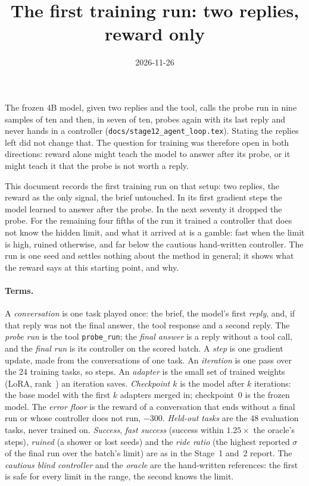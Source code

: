 \documentclass[11pt,a4paper]{article}
\title{\textbf{The first training run: two replies, reward only}}
\author{}
\date{2026-11-26}
\begin{document}
\maketitle

\noindent
The frozen 4B model, given two replies and the tool, calls the probe run in
nine samples of ten and then, in seven of ten, probes again with its last
reply and never hands in a controller (\texttt{docs/stage12\_agent\_loop.tex}).
Stating the replies left did not change that. The question for training was
therefore open in both directions: reward alone might teach the model to
answer after its probe, or it might teach it that the probe is not worth a
reply.

This document records the first training run on that setup: two replies,
the reward as the only signal, the brief untouched. In its first
\TRstepsperiteration{} gradient steps the model learned to answer after the
probe. In the next seventy it dropped the probe. For the remaining four
fifths of the run it trained a controller that does not know the hidden
limit, and what it arrived at is a gamble: fast when the limit is high,
ruined otherwise, and far below the cautious hand-written controller.
The run is one seed and settles nothing about the method in general; it
shows what the reward says at this starting point, and why.

\paragraph{Terms.} A \emph{conversation} is one task played once: the brief,
the model's first \emph{reply}, and, if that reply was not the final answer,
the tool response and a second reply. The \emph{probe run} is the tool
\texttt{probe\_run}; the \emph{final answer} is a reply without a tool call,
and the \emph{final run} is its controller on the scored batch. A
\emph{step} is one gradient update, made from the conversations of one task.
An \emph{iteration} is one pass over the 24 training tasks, so
\TRstepsperiteration{} steps. An \emph{adapter} is the small set of trained
weights (LoRA, rank~\TRrank) an iteration saves. \emph{Checkpoint $k$} is the
model after $k$ iterations: the base model with the first $k$ adapters
merged in; checkpoint~0 is the frozen model. The \emph{error floor} is the
reward of a conversation that ends without a final run or whose controller
does not run, $-300$. \emph{Held-out tasks} are the 48 evaluation tasks,
never trained on. \emph{Success}, \emph{fast success} (success within
$1.25\times$ the oracle's steps), \emph{ruined} (a shower or lost seeds) and
the \emph{ride ratio} (the highest reported $\sigma$ of the final run over
the batch's limit) are as in the Stage~1 and~2 report. The \emph{cautious
blind controller} and the \emph{oracle} are the hand-written references:
the first is safe for every limit in the range, the second knows the limit.
\end{document}
